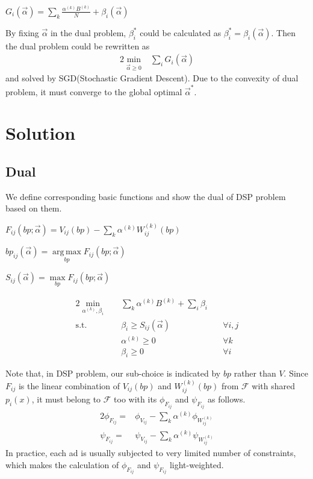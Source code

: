 \documentclass[sigconf]{acmart}
\DeclareMathOperator*{\argmax}{arg\,max}
\newcommand{\sumi}{\sum\limits_i}
\newcommand{\sumk}{\sum\limits_k}
\newcommand{\sbp}{bp_{ij}}
\newcommand{\sV}{V_{ij}}
\newcommand{\sW}{W_{ij}^{(k)}}
\newcommand{\sB}{B^{(k)}}
\newcommand{\salpha}{\alpha^{(k)}}
\newcommand{\sbeta}{\beta_i}
\newcommand{\sF}{F_{ij}}
\newcommand{\sS}{S_{ij}}
\newcommand{\sG}{G_i}
\newcommand{\valpha}{\vec{\alpha}}
\newcommand{\pprob}{\phi}
\newcommand{\pcost}{\psi}
\newcommand{\uff}{\mathscr{F}}
\newcommand{\scoreconstraint}{\sbeta \ge \sS(\vec{\alpha})}
\begin{document}
\begin{definition}
$\sG(\valpha) = \sum\limits_k \frac{\salpha \sB}{N} + \sbeta(\valpha)$
\end{definition}

By fixing $\valpha$ in the dual problem, $\sbeta^*$ could be calculated as $\sbeta^* = \sbeta(\valpha)$.
Then the dual problem could be rewritten as 
\begin{alignat}{2}
\min\limits_{\valpha \ge 0} & \sum\limits_i \sG(\valpha)
\end{alignat}
    and solved by SGD(Stochastic Gradient Descent).
Due to the convexity of dual problem, it must converge to the global optimal $\valpha^*$.

\section{Solution} \label{Solution}

\subsection{Dual}

We define corresponding basic functions and show the dual of DSP problem based on them.

\begin{definition}
$\sF(bp; \valpha) = \sV(bp) - \sumk \salpha \sW(bp)$
\end{definition}

\begin{definition}
$\sbp(\valpha) = \argmax\limits_{bp} \sF(bp; \valpha)$
\end{definition}

\begin{definition}
$\sS(\valpha) = \max\limits_{bp} \sF(bp; \valpha)$
\end{definition}

\begin{alignat}{2}
    \min\limits_{\salpha, \sbeta} \quad & \sumk \salpha \sB + \sumi \sbeta \quad & {} \\
    \mbox{s.t.} \quad                   & \scoreconstraint \quad                 & \forall i,j \\
    \quad                               & \salpha \ge 0 \quad                    & \forall k \\
    \quad                               & \sbeta \ge 0 \quad                     & \forall i
\end{alignat}

Note that, in DSP problem, our sub-choice is indicated by $bp$ rather than $V$.
Since $\sF$ is the linear combination of $\sV(bp)$ and $\sW(bp)$ from $\uff$ with shared $p_i(x)$,
    it must belong to $\uff$ too with its $\pprob_{\sF}$ and $\pcost_{\sF}$ as follows.
\begin{alignat}{2}
\pprob_{\sF}= & \pprob_{\sV} - \sum\limits_k \salpha \pprob_{\sW} \\
\pcost_{\sF}= & \pcost_{\sV} - \sum\limits_k \salpha \pcost_{\sW}
\end{alignat}
In practice, each ad is usually subjected to very limited number of constraints,
    which makes the calculation of $\pprob_{\sF}$ and $\pcost_{\sF}$ light-weighted.
\end{document}
